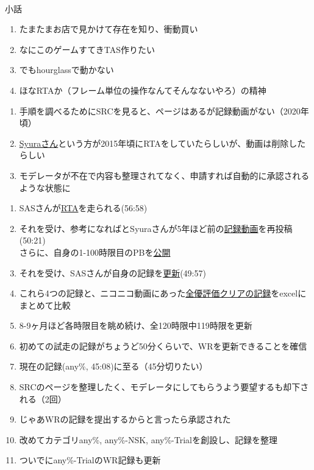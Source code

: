 \clearpage
~\vfill
\begin{\Columnname}{小話}
\begin{enumerate}[label={\sarrow}]
\item たまたまお店で見かけて存在を知り、衝動買い

\tcbline*
\item なにこのゲームすてきTAS作りたい
\item でもhourglassで動かない
\item ほなRTAか（フレーム単位の操作なんてそんなないやろ）の精神
\end{enumerate}

\tcbline*
\begin{enumerate}[label={\sarrow}]
\item 手順を調べるためにSRCを見ると、ページはあるが記録動画がない（2020年頃）
\item \href{https://www.speedrun.com/users/Syura}{Syuraさん}という方が2015年頃にRTAをしていたらしいが、動画は削除したらしい
\item モデレータが不在で内容も整理されてなく、申請すれば自動的に承認されるような状態に
\end{enumerate}

\tcbline*
\begin{enumerate}[label={\sarrow}]
\item SASさんが\href{https://www.speedrun.com/komeiji_satori_no_jousou_kyouiku/runs/znol46vy}{RTA}を走られる(56:58)
\item それを受け、参考になればとSyuraさんが5年ほど前の\href{https://www.speedrun.com/komeiji_satori_no_jousou_kyouiku/runs/m3n4v8qy}{記録動画}を再投稿(50:21)\\
      さらに、自身の1-100時限目のPBを\href{https://pastebin.com/0nH3mJSZ}{公開}
\item それを受け、SASさんが自身の記録を\href{https://www.speedrun.com/komeiji_satori_no_jousou_kyouiku/runs/m3ro3edm}{更新}(49:57)

\tcbline*
\item これら4つの記録と、ニコニコ動画にあった\href{https://www.nicovideo.jp/watch/sm18710850}{全優評価クリアの記録}をexcelにまとめて比較
\item 8-9ヶ月ほど各時限目を眺め続け、全120時限中119時限を更新
\item 初めての試走の記録がちょうど50分くらいで、WRを更新できることを確信
\item 現在の記録(any\%, 45:08)に至る（45分切りたい）

\tcbline*
\item SRCのページを整理したく、モデレータにしてもらうよう要望するも却下される（2回）
\item じゃあWRの記録を提出するからと言ったら承認された
\item 改めてカテゴリany\%, any\%-NSK, any\%-Trialを創設し、記録を整理
\item ついでにany\%-TrialのWR記録も更新


\end{enumerate}
\end{\Columnname}
